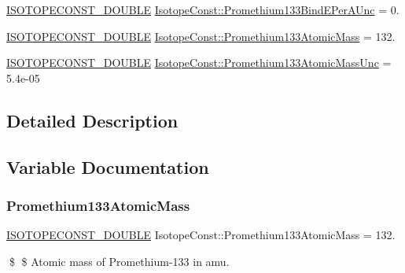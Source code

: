 \begin{DoxyCompactItemize}
\item 
\mbox{\hyperlink{group___isotope_const-_macros_ga8f45a7272ce02c0b4c65c44636ed719a}{I\+S\+O\+T\+O\+P\+E\+C\+O\+N\+S\+T\+\_\+\+D\+O\+U\+B\+LE}} \mbox{\hyperlink{group___isotope_const-_promethium-_pm133_gaae44dc3dc1af7785c603e0151eb24bb2}{Isotope\+Const\+::\+Promethium133\+Bind\+E\+Per\+A\+Unc}} = 0.
\item 
\mbox{\hyperlink{group___isotope_const-_macros_ga8f45a7272ce02c0b4c65c44636ed719a}{I\+S\+O\+T\+O\+P\+E\+C\+O\+N\+S\+T\+\_\+\+D\+O\+U\+B\+LE}} \mbox{\hyperlink{group___isotope_const-_promethium-_pm133_ga41b32fd9b6ca0155e710897e09640790}{Isotope\+Const\+::\+Promethium133\+Atomic\+Mass}} = 132.
\item 
\mbox{\hyperlink{group___isotope_const-_macros_ga8f45a7272ce02c0b4c65c44636ed719a}{I\+S\+O\+T\+O\+P\+E\+C\+O\+N\+S\+T\+\_\+\+D\+O\+U\+B\+LE}} \mbox{\hyperlink{group___isotope_const-_promethium-_pm133_ga64824a0e4c461a391549273d75228670}{Isotope\+Const\+::\+Promethium133\+Atomic\+Mass\+Unc}} = 5.\+4e-\/05
\end{DoxyCompactItemize}


\subsection{Detailed Description}


\subsection{Variable Documentation}
\mbox{\label{group___isotope_const-_promethium-_pm133_ga41b32fd9b6ca0155e710897e09640790}} 
\subsubsection{\texorpdfstring{Promethium133\+Atomic\+Mass}{Promethium133AtomicMass}}
{\footnotesize\ttfamily \mbox{\hyperlink{group___isotope_const-_macros_ga8f45a7272ce02c0b4c65c44636ed719a}{I\+S\+O\+T\+O\+P\+E\+C\+O\+N\+S\+T\+\_\+\+D\+O\+U\+B\+LE}} Isotope\+Const\+::\+Promethium133\+Atomic\+Mass = 132.}

\$ \$ Atomic mass of Promethium-\/133 in amu. \mbox{\label{group___isotope_const-_promethium-_pm133_ga64824a0e4c461a391549273d75228670}} 
